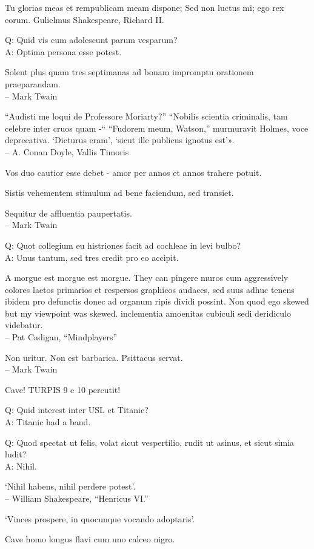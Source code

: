 \documentclass[titlepage,12pt]{memoir}
\begin{document}
Tu glorias meas et rempublicam meam dispone;
Sed non luctus mi; ego rex eorum.
Gulielmus Shakespeare, Richard II.

Q: Quid vis cum adolescunt parum vesparum?\\
A: Optima persona esse potest.

Solent plus quam tres septimanas ad bonam impromptu orationem praeparandam.
\\-- Mark Twain

 “Audisti me loqui de Professore Moriarty?”
“Nobilis scientia criminalis, tam celebre inter cruos quam -“
“Fudorem meum, Watson,” murmuravit Holmes, voce deprecativa.
‘Dicturus eram’, ‘sicut ille publicus ignotus est’».
\\-- A. Conan Doyle, Vallis Timoris

Vos duo cautior esse debet - amor per annos et annos trahere potuit.

Sistis vehementem stimulum ad bene faciendum, sed transiet.

Sequitur de affluentia paupertatis.
\\-- Mark Twain

Q: Quot collegium eu histriones facit ad cochleae in levi bulbo?\\
A: Unus tantum, sed tres credit pro eo accipit.

A morgue est morgue est morgue. They can pingere muros cum aggressively
colores laetos primarios et respersos graphicos audaces, sed suus adhuc tenens
ibidem pro defunctis donec ad organum ripis dividi possint. Non quod ego
skewed but my viewpoint was skewed. inclementia
amoenitas cubiculi sedi deridiculo videbatur.
\\-- Pat Cadigan, “Mindplayers”

Non uritur. Non est barbarica. Psittacus servat.
\\-- Mark Twain

Cave! TURPIS 9 e 10 percutit!

Q: Quid interest inter USL et Titanic?\\
A: Titanic had a band.

Q: Quod spectat ut felis, volat sicut vespertilio, rudit ut asinus, et
sicut simia ludit?\\
A: Nihil.

‘Nihil habens, nihil perdere potest’.
\\-- William Shakespeare, “Henricus VI.”

‘Vinces prospere, in quocunque vocando adoptaris’.

Cave homo longus flavi cum uno calceo nigro.
\end{document}
